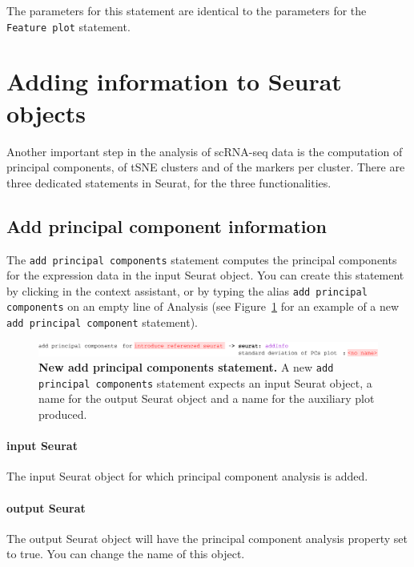 The parameters for this statement are identical to the parameters for the \texttt{Feature plot}
statement.

\section{Adding information to Seurat objects}
Another important step in the analysis of scRNA-seq data is the computation of principal
components, of tSNE clusters and of the markers per cluster. There are three dedicated
statements in Seurat, for the three functionalities.

\subsection{Add principal component information}
The \texttt{add principal components} statement computes the principal components for the expression
data in the input Seurat object. You can create this statement by clicking
 in the context assistant, or by typing
the alias \texttt{add principal components} on an empty line of Analysis (see Figure~\ref{fig:AddPCA}
for an example of a new \texttt{add principal component} statement).

\begin{figure}[h!tbp]
  \centering
    \includegraphics[width=\figWidthWide]{figures/AddPCA.pdf}
    \caption[New add principal components statement.]{\textbf{New add principal components statement.} A new
    \texttt{add principal components} statement expects an input Seurat object, a name for the output Seurat object
    and a name for the auxiliary plot produced.}
\label{fig:AddPCA}
\end{figure}

\paragraph{input Seurat} The input Seurat object for which principal component analysis is added.

\paragraph{output Seurat} The output Seurat object will have the principal component analysis
property set to true. You can change the name of this object.

